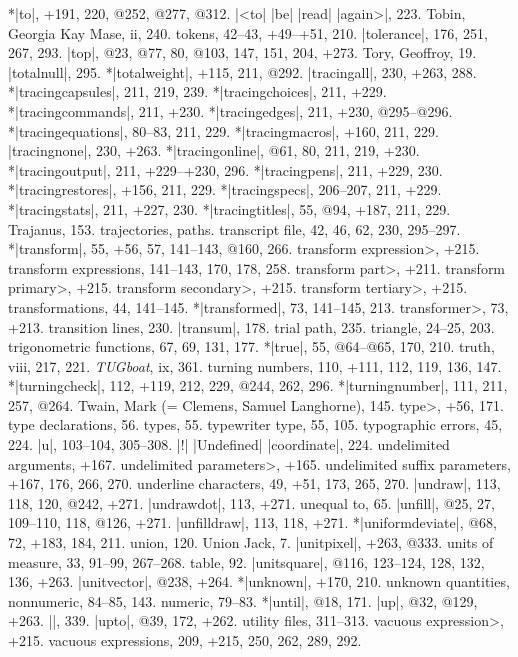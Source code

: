 *|to|, +191, 220, @252, @277, @312.
|<to| |be| |read| |again>|, 223.
Tobin, Georgia Kay Mase, ii, 240.
tokens, 42--43, +49--+51, 210.
|tolerance|, 176, 251, 267, 293.
|top|, @23, @77, 80, @103, 147, 151, 204, +273.
Tory, Geoffroy, 19.
|totalnull|, 295.
*|totalweight|, +115, 211, @292.
|tracingall|, 230, +263, 288.
*|tracingcapsules|, 211, 219, 239.
*|tracingchoices|, 211, +229.
*|tracingcommands|, 211, +230.
*|tracingedges|, 211, +230, @295--@296.
*|tracingequations|, 80--83, 211, 229.
*|tracingmacros|, +160, 211, 229.
|tracingnone|, 230, +263.
*|tracingonline|, @61, 80, 211, 219, +230.
*|tracingoutput|, 211, +229--+230, 296.
*|tracingpens|, 211, +229, 230.
*|tracingrestores|, +156, 211, 229.
*|tracingspecs|, 206--207, 211, +229.
*|tracingstats|, 211, +227, 230.
*|tracingtitles|, 55, @94, +187, 211, 229.
Trajanus, 153.
trajectories, \see paths.
transcript file, 42, 46, 62, 230, 295--297.
*|transform|, 55, +56, 57, 141--143, @160, 266.
\<transform expression>, +215.
transform expressions, 141--143, 170, 178, 258.
\<transform part>, +211.
\<transform primary>, +215.
\<transform secondary>, +215.
\<transform tertiary>, +215.
transformations, 44, 141--145.
*|transformed|, 73, 141--145, 213.
\<transformer>, 73, +213.
transition lines, 230.
|transum|, 178.
trial path, 235.
triangle, 24--25, 203.
trigonometric functions, 67, 69, 131, 177.
*|true|, 55, @64--@65, 170, 210.
truth, viii, 217, 221.
{\sl TUGboat}, ix, 361.
turning numbers, 110, +111, 112, 119, 136, 147.
*|turningcheck|, 112, +119, 212, 229, @244, 262, 296.
*|turningnumber|, 111, 211, 257, @264.
Twain, Mark (= Clemens, Samuel Langhorne), 145.
\<type>, +56, 171.
type declarations, 56.
types, 55.
typewriter type, 55, 105.
typographic errors, 45, 224.
\newletter
|u|, 103--104, 305--308.
|!| |Undefined| |coordinate|, 224.
undelimited arguments, +167.
\<undelimited parameters>, +165.
undelimited suffix parameters, +167, 176, 266, 270.
underline characters, 49, +51, 173, 265, 270.
|undraw|, 113, 118, 120, @242, +271.
|undrawdot|, 113, +271.
unequal to, 65.
|unfill|, @25, 27, 109--110, 118, @126, +271.
|unfilldraw|, 113, 118, +271.
*|uniformdeviate|, @68, 72, +183, 184, 211.
union, 120.
Union Jack, 7.
|unitpixel|, +263, @333.
units of measure, 33, 91--99, 267--268.
\sub table, 92.
|unitsquare|, @116, 123--124, 128, 132, 136, +263.
|unitvector|, @238, +264.
*|unknown|, +170, 210.
unknown quantities, nonnumeric, 84--85, 143.
\sub numeric, 79--83.
*|until|, @18, 171.
|up|, @32, @129, +263.
|\uppers|, 339.
|upto|, @39, 172, +262.
utility files, 311--313.
\newletter
\<vacuous expression>, +215.
vacuous expressions, 209, +215, 250, 262, 289, 292.
